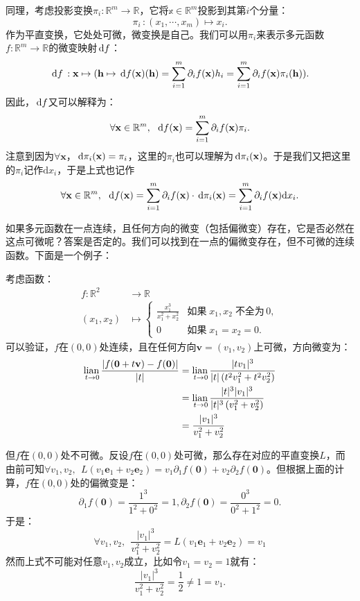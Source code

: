 \documentclass[12pt,UTF8]{ctexbook}
\begin{document}
同理，考虑投影变换$\pi_i:\mathbb{R}^m\rightarrow\mathbb{R}$，它将$\mathbb{x}\in\mathbb{R}^m$投影到其第$i$个分量：
$$ \pi_i \, : (x_1,\cdots,x_m) \mapsto x_i. $$
作为平直变换，它处处可微，微变换是自己。我们可以用$\pi_i$来表示多元函数$f:\mathbb{R}^m\to\mathbb{R}$的微变映射$\,\mathrm{d} f$：
$$ \,\mathrm{d} f \,: \mathbf{x} \mapsto (\mathbf{h}\mapsto \,\mathrm{d} f(\mathbf{x})(\mathbf{h}) = \sum_{i=1}^m \partial_i f(\mathbf{x}) h_i = \sum_{i=1}^m \partial_i f(\mathbf{x}) \pi_i(\mathbf{h})). $$
因此，$\,\mathrm{d} f$又可以解释为：
$$ \forall \mathbf{x}\in\mathbb{R}^m, \,\,\,\,\mathrm{d} f(\mathbf{x}) = \sum_{i=1}^m\partial_i f(\mathbf{x}) \pi_i. $$
注意到因为$\forall \mathbf{x}$，$\,\mathrm{d} \pi_i(\mathbf{x}) = \pi_i$，这里的$\pi_i$也可以理解为$\,\mathrm{d} \pi_i(\mathbf{x})$。于是我们又把这里的$\pi_i$记作$\mathrm{d}x_i$，于是上式也记作
$$ \forall \mathbf{x}\in\mathbb{R}^m, \,\,\,\,\mathrm{d} f(\mathbf{x}) = \sum_{i=1}^m\partial_i f(\mathbf{x})\cdot \,\mathrm{d} \pi_i(\mathbf{x}) = \sum_{i=1}^m\partial_i f(\mathbf{x}) \mathrm{d}x_i. $$

如果多元函数在一点连续，且任何方向的微变（包括偏微变）存在，它是否必然在这点可微呢？答案是否定的。我们可以找到在一点的偏微变存在，但不可微的连续函数。下面是一个例子：

考虑函数：
\begin{align*}
    f: \mathbb{R}^2 &\rightarrow \mathbb{R} \\
    (x_1, x_2) &\mapsto \begin{cases}
        \displaystyle\frac{x_1^3}{x_1^2 + x_2^2} & \mbox{如果}\; x_1, x_2\; \mbox{不全为}\, 0,\\
        0 & \mbox{如果}\; x_1 = x_2 = 0.
    \end{cases}
\end{align*}
可以验证，$f$在$(0,0)$处连续，且在任何方向$\mathbf{v} = (v_1, v_2)$上可微，方向微变为：
\begin{align*}
    \underset{t\to 0}{\operatorname{lian}\,} \frac{\left|f(\mathbf{0} + t\mathbf{v}) - f(\mathbf{0})\right|}{|t|} &= \underset{t\to 0}{\operatorname{lian}\,} \frac{|tv_1|^3}{|t|\left(t^2v_1^2 + t^2v_2^2\right)} \\
    &= \underset{t\to 0}{\operatorname{lian}\,} \frac{|t|^3|v_1|^3}{|t|^3\left(v_1^2 + v_2^2\right)} \\
    &= \frac{|v_1|^3}{v_1^2 + v_2^2}
\end{align*}

但$f$在$(0,0)$处不可微。反设$f$在$(0,0)$处可微，那么存在对应的平直变换$L$，而由前可知$\forall v_1, v_2,\;\,L(v_1 \mathbf{e}_1 + v_2 \mathbf{e}_2) = v_1 \partial_{1} f(\mathbf{0}) + v_2 \partial_{2} f(\mathbf{0}) $。但根据上面的计算，$f$在$(0,0)$处的偏微变是：
$$ \partial_{1} f(\mathbf{0}) = \frac{1^3}{1^2 + 0^2} = 1, \partial_{2} f(\mathbf{0}) = \frac{0^3}{0^2 + 1^2} = 0. $$
于是：
$$\forall v_1, v_2,\;\, \frac{|v_1|^3}{v_1^2 + v_2^2} = L(v_1 \mathbf{e}_1 + v_2 \mathbf{e}_2) = v_1 $$
然而上式不可能对任意$v_1, v_2$成立，比如令$v_1=v_2 = 1$就有：
$$ \frac{|v_1|^3}{v_1^2 + v_2^2} = \frac{1}{2} \neq 1 = v_1. $$
\end{document}
